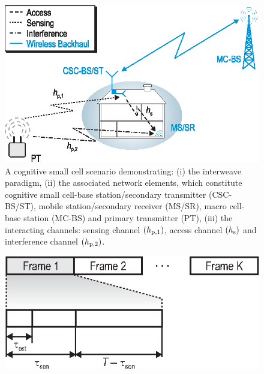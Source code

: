 \begin{figure}[!t]
\centering
\includegraphics[width = \figscalet]{figures/CR_Scenario_Interweave}
\caption{A cognitive small cell scenario demonstrating: (i) the interweave paradigm, (ii) the associated network elements, which constitute cognitive small cell-base station/secondary transmitter (CSC-BS/ST), mobile station/secondary receiver (MS/SR), macro cell-base station (MC-BS) and primary transmitter (PT), (iii) the interacting channels: sensing channel $(h_{\text{p,1}})$, access channel $(h_{\text{s}})$ and interference channel $(h_{\text{p,2}})$.} 
\label{fig:scenario}
\vspace{-0.5cm}
\end{figure}
\begin{figure}[!t]
\centering
\includegraphics[width = \figscalet]{figures/Frame_Structure_grau}
\caption{}
\label{fig:fs}
\vspace{-0.5cm}
\end{figure}


